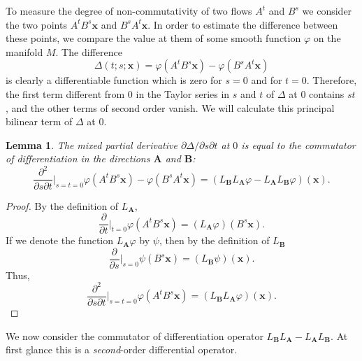 \documentclass{book}
\numberwithin{equation}{section}
\theoremstyle{plain}
\newtheorem{lem}[thm]{Lemma} %
\theoremstyle{definition}
\theoremstyle{remark}
\theoremstyle{remark}
\begin{document}
To measure the degree of non-commutativity
of two flows $A^t$ and $B^s$ we consider the two points
$A^tB^s\mathbf x$ and $B^sA^t\mathbf x$.
%
In order to estimate the difference between these points,
we compare the value at them of some smooth function
$\varphi$ on the manifold $M$. The difference
$$
\Delta(t; s; \mathbf x)
=
\varphi(A^tB^s\mathbf x)
-
\varphi(B^sA^t\mathbf x)
$$
is clearly a differentiable function which is zero for $s = 0$
and for $t = 0$.
Therefore, the first term different from $0$ in the Taylor series
in $s$ and $t$ of $\Delta$ at $0$ contains $st$,
and the other terms of second order vanish.
%
We will calculate this principal bilinear term of $\Delta$ at $0$.


\begin{lem}
  The mixed partial derivative $\partial \Delta/\partial s \partial t$ at $0$
  is equal to the commutator of differentiation in the directions
  $\mathbf A$ and $\mathbf B$:
  $$
  \frac{\partial^2}{\partial s \partial t}\bigg|_{s=t=0}
  {\varphi(A^tB^s\mathbf x) - \varphi(B^sA^t\mathbf x)}
  =
  (L_\mathbf{B} L_\mathbf{A} \varphi
  -L_\mathbf{A} L_\mathbf{B} \varphi)
  (\mathbf x).
  $$
\end{lem}

\begin{proof}
  By the definition of $L_\mathbf{A}$,
  $$
  \frac{\partial}{\partial t}\bigg|_{t=0}
  \varphi(A^tB^s\mathbf x)
  =
  (L_\mathbf{A} \varphi)(B^s\mathbf x).
  $$
  If we denote the function $L_\mathbf{A}\varphi$ by $\psi$,
  then by the definition of $L_\mathbf{B}$
  $$
  \frac{\partial}{\partial s}\bigg|_{s=0}
  \psi(B^s\mathbf x)
  =
  (L_\mathbf{B} \psi)(\mathbf x).
  $$
  Thus,
  $$
  \frac{\partial^2}{\partial s \partial t}\bigg|_{s=t=0}
  \varphi(A^tB^s\mathbf x)
  =
  (L_\mathbf{B} L_\mathbf{A} \varphi)(\mathbf x).
  $$
\end{proof}

We now consider the commutator of differentiation operator
$L_\mathbf{B} L_\mathbf{A} - L_\mathbf{A} L_\mathbf{B}$.
%
At first glance this is a \emph{second}-order differential operator.
\end{document}
